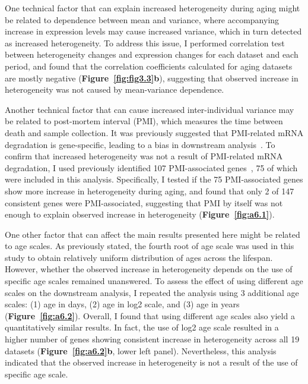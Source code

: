 One technical factor that can explain increased heterogeneity during aging might be related to dependence between mean and variance, 
where accompanying increase in expression levels may cause increased variance, which in turn detected as increased heterogeneity.
To address this issue, I performed correlation test between heterogeneity changes and expression changes for each dataset and each period, 
and found that the correlation coefficients calculated for aging datasets are mostly negative (\textbf{Figure~\ref{fig:fig3.3}b}), 
suggesting that observed increase in heterogeneity was not caused by mean-variance dependence.

Another technical factor that can cause increased inter-individual variance may be related to post-mortem interval (PMI), 
which measures the time between death and sample collection.
It was previously suggested that PMI-related mRNA degradation is gene-specific, leading to a bias in downstream analysis~\cite{Zhu2017}.
To confirm that increased heterogeneity was not a result of PMI-related mRNA degradation,
I used previously identified 107 PMI-associated genes~\cite{Zhu2017}, 75 of which were included in this analysis.
Specifically, I tested if the 75 PMI-associated genes show more increase in heterogeneity during aging,
and found that only 2 of 147 consistent genes were PMI-associated, 
suggesting that PMI by itself was not enough to explain observed increase in heterogeneity (\textbf{Figure~\ref{fig:a6.1}}).

One other factor that can affect the main results presented here might be related to age scales.
As previously stated, the fourth root of age scale was used in this study to obtain relatively uniform distribution of ages across the lifespan.
However, whether the observed increase in heterogeneity depends on the use of specific age scales remained unanswered.
To assess the effect of using different age scales on the downstream analysis, I repeated the analysis using 3 additional age scales: 
(1) age in days, (2) age in log2 scale, and (3) age in years (\textbf{Figure~\ref{fig:a6.2}}).
Overall, I found that using different age scales also yield a quantitatively similar results.
In fact, the use of log2 age scale resulted in a higher number of genes showing consistent increase in heterogeneity across all 19 datasets (\textbf{Figure~\ref{fig:a6.2}b}, lower left panel).
Nevertheless, this analysis indicated that the observed increase in heterogeneity is not a result of the use of specific age scale.

